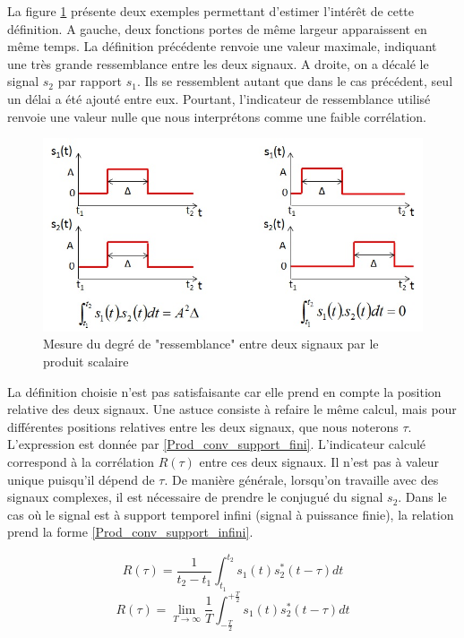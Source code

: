 	La figure \ref{Fig:ressemblance_via_produit_scalaire} présente deux exemples permettant d'estimer l'intérêt de cette définition. A gauche, deux fonctions portes de même largeur apparaissent en même temps. La définition précédente renvoie une valeur maximale, indiquant une très grande ressemblance entre les deux signaux. A droite, on a décalé le signal $s_{2}$ par rapport $s_{1}$. Ils se ressemblent autant que dans le cas précédent, seul un délai a été ajouté entre eux. Pourtant, l'indicateur de ressemblance utilisé renvoie une valeur nulle que nous interprétons comme une faible corrélation.
	\begin{figure}[h!]
		\centering
		\includegraphics[scale=0.5]{images/ressemblance_via_produit_scalaire.jpg}
		\caption{Mesure du degré de "ressemblance" entre deux signaux par le produit scalaire}	
		\label{Fig:ressemblance_via_produit_scalaire} 
	\end{figure}
	
	La définition choisie n'est pas satisfaisante car elle prend en compte la position relative des deux signaux. Une astuce consiste à refaire le même calcul, mais pour différentes positions relatives entre les deux signaux, que nous noterons $\tau$. L'expression est donnée par \ref{Prod_conv_support_fini}. L'indicateur calculé correspond à la corrélation $R(\tau)$ entre ces deux signaux. Il n'est pas à valeur unique puisqu'il dépend de $\tau$. De manière générale, lorsqu'on travaille avec des signaux complexes, il est nécessaire de prendre le conjugué du signal $s_{2}$. Dans le cas où le signal est à support temporel infini (signal à puissance finie), la relation prend la forme \ref{Prod_conv_support_infini}.
	
	\begin{equation}\label{Prod_conv_support_fini}
	R(\tau)=\frac{1}{t_{2}-t_{1}}\int_{t_{1}}^{t_{2}}s_{1}(t)s^{*}_{2}(t-\tau)dt
	\end{equation}
	\begin{equation}\label{Prod_conv_support_infini}
	R(\tau)=\lim_{T \to \infty}\frac{1}{T}\int_{-\frac{T}{2}}^{+\frac{T}{2}}s_{1}(t)s^{*}_{2}(t-\tau)dt
	\end{equation}
	
